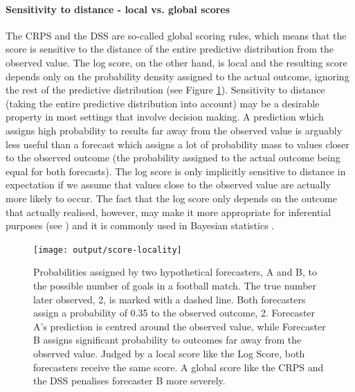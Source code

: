 \documentclass[
]{jss}
\begin{document}
\hypertarget{localglobal}{%
\paragraph{Sensitivity to distance - local vs. global
scores}\label{localglobal}}

The CRPS and the DSS are so-called global scoring rules, which means
that the score is sensitive to the distance of the entire predictive
distribution from the observed value. The log score, on the other hand,
is local and the resulting score depends only on the probability density
assigned to the actual outcome, ignoring the rest of the predictive
distribution (see Figure \ref{fig:score-locality}). Sensitivity to
distance (taking the entire predictive distribution into account) may be
a desirable property in most settings that involve decision making. A
prediction which assigns high probability to results far away from the
observed value is arguably less useful than a forecast which assigns a
lot of probability mass to values closer to the observed outcome (the
probability assigned to the actual outcome being equal for both
forecasts). The log score is only implicitly sensitive to distance in
expectation if we assume that values close to the observed value are
actually more likely to occur. The fact that the log score only depends
on the outcome that actually realised, however, may make it more
appropriate for inferential purposes (see
\citep{winklerScoringRulesEvaluation1996}) and it is commonly used in
Bayesian statistics
\citep{gelmanUnderstandingPredictiveInformation2014}.

\begin{CodeChunk}
\begin{figure}

{\centering \texttt{[image: output/score-locality]} 

}

\caption[Probabilities assigned by two hypothetical forecasters, A and B, to the possible number of goals in a football match]{Probabilities assigned by two hypothetical forecasters, A and B, to the possible number of goals in a football match. The true number later observed, 2, is marked with a dashed line. Both forecasters assign a probability of 0.35 to the observed outcome, 2. Forecaster A's prediction is centred around the observed value, while Forecaster B assigns significant probability to outcomes far away from the observed value. Judged by a local score like the Log Score, both forecasters receive the same score. A global score like the CRPS and the DSS penalises forecaster B more severely.}\label{fig:score-locality}
\end{figure}
\end{CodeChunk}
\end{document}
